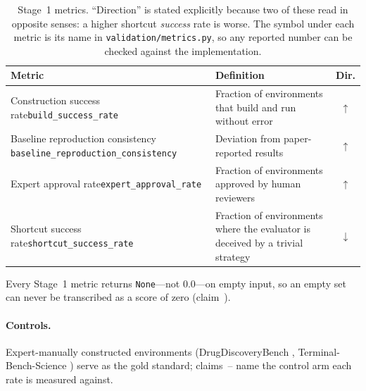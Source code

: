 \begin{table}[t]
\centering
\small
\caption{Stage~1 metrics. ``Direction'' is stated explicitly because two of
these read in opposite senses: a higher shortcut \emph{success} rate is worse.
The symbol under each metric is its name in \texttt{validation/metrics.py}, so
any reported number can be checked against the implementation.}
\label{tab:stage1}
\begin{tabular}{@{}p{1.55in}p{3.5in}c@{}}
\toprule
Metric & Definition & Dir. \\
\midrule
Construction success rate\newline \texttt{build\_success\_rate}
  & Fraction of environments that build and run without error & $\uparrow$ \\
Baseline reproduction consistency\newline
  \texttt{baseline\_\allowbreak reproduction\_\allowbreak consistency}
  & Deviation from paper-reported results & $\uparrow$ \\
Expert approval rate\newline \texttt{expert\_approval\_rate}
  & Fraction of environments approved by human reviewers & $\uparrow$ \\
Shortcut success rate\footnotemark\newline \texttt{shortcut\_success\_rate}
  & Fraction of environments where the evaluator is deceived by a trivial
    strategy & $\downarrow$ \\
\bottomrule
\end{tabular}
\end{table}

Every Stage~1 metric returns \texttt{None}---not $0.0$---on empty input, so an
empty set can never be transcribed as a score of zero (claim~).

\paragraph{Controls.} Expert-manually constructed environments
(DrugDiscoveryBench \cite{drugdiscoverybench}, Terminal-Bench-Science
\cite{tbscience}) serve as the gold standard; claims~-- name the
control arm each rate is measured against.

